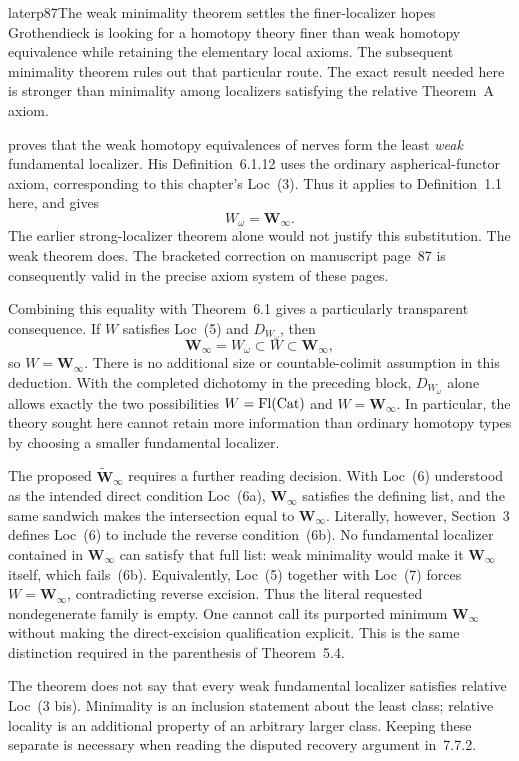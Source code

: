 \begin{dcomment}{later}{p87}{The weak minimality theorem settles the finer-localizer hopes}
Grothendieck is looking for a homotopy theory finer than weak homotopy equivalence while retaining the elementary local axioms. The subsequent minimality theorem rules out that particular route. The exact result needed here is stronger than minimality among localizers satisfying the relative Theorem~A axiom.

\citet[Theorem~6.1.18, pp.~242--243]{Cisinski2006} proves that the weak homotopy equivalences of nerves form the least \emph{weak} fundamental localizer. His Definition~6.1.12 uses the ordinary aspherical-functor axiom, corresponding to this chapter's Loc~(3). Thus it applies to Definition~1.1 here, and gives
\[
 W_\omega=\mathbf W_\infty.
\]
The earlier strong-localizer theorem alone would not justify this substitution. The weak theorem does. The bracketed correction on manuscript page~87 is consequently valid in the precise axiom system of these pages.

Combining this equality with Theorem~6.1 gives a particularly transparent consequence. If $W$ satisfies Loc~(5) and $D_{W_\omega}$, then
\[
 \mathbf W_\infty=W_\omega\subset W\subset\mathbf W_\infty,
\]
so $W=\mathbf W_\infty$. There is no additional size or countable-colimit assumption in this deduction. With the completed dichotomy in the preceding block, $D_{W_\omega}$ alone allows exactly the two possibilities $W=\operatorname{Fl}(\mathrm{Cat})$ and $W=\mathbf W_\infty$. In particular, the theory sought here cannot retain more information than ordinary homotopy types by choosing a smaller fundamental localizer.

The proposed $\widetilde{\mathbf W}_\infty$ requires a further reading decision. With Loc~(6) understood as the intended direct condition Loc~(6a), $\mathbf W_\infty$ satisfies the defining list, and the same sandwich makes the intersection equal to $\mathbf W_\infty$. Literally, however, Section~3 defines Loc~(6) to include the reverse condition~(6b). No fundamental localizer contained in $\mathbf W_\infty$ can satisfy that full list: weak minimality would make it $\mathbf W_\infty$ itself, which fails~(6b). Equivalently, Loc~(5) together with Loc~(7) forces $W=\mathbf W_\infty$, contradicting reverse excision. Thus the literal requested nondegenerate family is empty. One cannot call its purported minimum $\mathbf W_\infty$ without making the direct-excision qualification explicit. This is the same distinction required in the parenthesis of Theorem~5.4.

The theorem does not say that every weak fundamental localizer satisfies relative Loc~(3 bis). Minimality is an inclusion statement about the least class; relative locality is an additional property of an arbitrary larger class. Keeping these separate is necessary when reading the disputed recovery argument in~7.7.2.
\end{dcomment}


